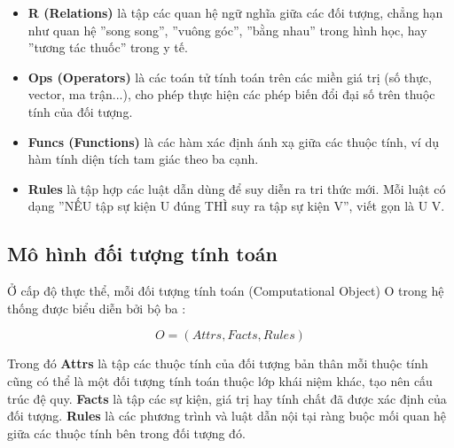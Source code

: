 \documentclass[13pt,a4paper,oneside]{extreport}
\begin{document}
\begin{itemize}
  \item \textbf{R (Relations)} là tập các quan hệ ngữ nghĩa giữa các đối tượng, chẳng hạn như quan hệ ''song song'', ''vuông góc'', ''bằng nhau'' trong hình học, hay ''tương tác thuốc'' trong y tế.
\end{itemize}



\begin{itemize}
  \item \textbf{Ops (Operators)} là các toán tử tính toán trên các miền giá trị (số thực, vector, ma trận...), cho phép thực hiện các phép biến đổi đại số trên thuộc tính của đối tượng.
\end{itemize}



\begin{itemize}
  \item \textbf{Funcs (Functions)} là các hàm xác định ánh xạ giữa các thuộc tính, ví dụ hàm tính diện tích tam giác theo ba cạnh.
\end{itemize}



\begin{itemize}
  \item \textbf{Rules} là tập hợp các luật dẫn dùng để suy diễn ra tri thức mới. Mỗi luật có dạng ''NẾU tập sự kiện U đúng THÌ suy ra tập sự kiện V'', viết gọn là U  V.
\end{itemize}



\subsection{Mô hình đối tượng tính toán}


Ở cấp độ thực thể, mỗi đối tượng tính toán (Computational Object) O trong hệ thống được biểu diễn bởi bộ ba \cite{Dvn_Ijcsi}:


\begin{equation}
O = (Attrs, Facts, Rules)
\end{equation}


Trong đó \textbf{Attrs} là tập các thuộc tính của đối tượng  bản thân mỗi thuộc tính cũng có thể là một đối tượng tính toán thuộc lớp khái niệm khác, tạo nên cấu trúc đệ quy. \textbf{Facts} là tập các sự kiện, giá trị hay tính chất đã được xác định của đối tượng. \textbf{Rules} là các phương trình và luật dẫn nội tại ràng buộc mối quan hệ giữa các thuộc tính bên trong đối tượng đó.
\end{document}

